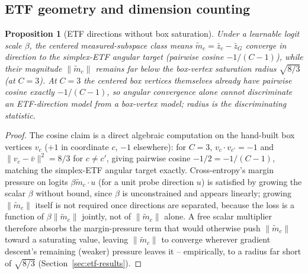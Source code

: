 \documentclass[pdflatex,sn-mathphys-ay]{sn-jnl}
\theoremstyle{thmstyleone}
\newtheorem{proposition}[theorem]{Proposition}
\theoremstyle{thmstyletwo}
\begin{document}
\subsection{ETF geometry and dimension counting}
\label{sec:theory-etf}

\begin{proposition}[ETF directions without box saturation]
\label{prop:etf}
Under a learnable logit scale $\beta$, the centered measured-subspace class means $\tilde m_c = \bar z_c - \bar z_G$ converge in \emph{direction} to the simplex-ETF angular target (pairwise cosine $-1/(C{-}1)$), while their \emph{magnitude} $\|\tilde m_c\|$ remains far below the box-vertex saturation radius $\sqrt{8/3}$ (at $C=3$). At $C=3$ the centered box vertices themselves already have pairwise cosine exactly $-1/(C{-}1)$, so angular convergence alone cannot discriminate an ETF-direction model from a box-vertex model; radius is the discriminating statistic.
\end{proposition}
\begin{proof}
The cosine claim is a direct algebraic computation on the hand-built box vertices $v_c$ ($+1$ in coordinate $c$, $-1$ elsewhere): for $C=3$, $v_c\cdot v_{c'} = -1$ and $\|v_c-\bar v\|^2=8/3$ for $c\neq c'$, giving pairwise cosine $-1/2=-1/(C-1)$, matching the simplex-ETF angular target exactly. Cross-entropy's margin pressure on logits $\beta\tilde m_c\cdot u$ (for a unit probe direction $u$) is satisfied by growing the scalar $\beta$ without bound, since $\beta$ is unconstrained and appears linearly; growing $\|\tilde m_c\|$ itself is not required once directions are separated, because the loss is a function of $\beta\|\tilde m_c\|$ jointly, not of $\|\tilde m_c\|$ alone. A free scalar multiplier therefore absorbs the margin-pressure term that would otherwise push $\|\tilde m_c\|$ toward a saturating value, leaving $\|\tilde m_c\|$ to converge wherever gradient descent's remaining (weaker) pressure leaves it -- empirically, to a radius far short of $\sqrt{8/3}$ (Section~\ref{sec:etf-results}).
\end{proof}
\end{document}
